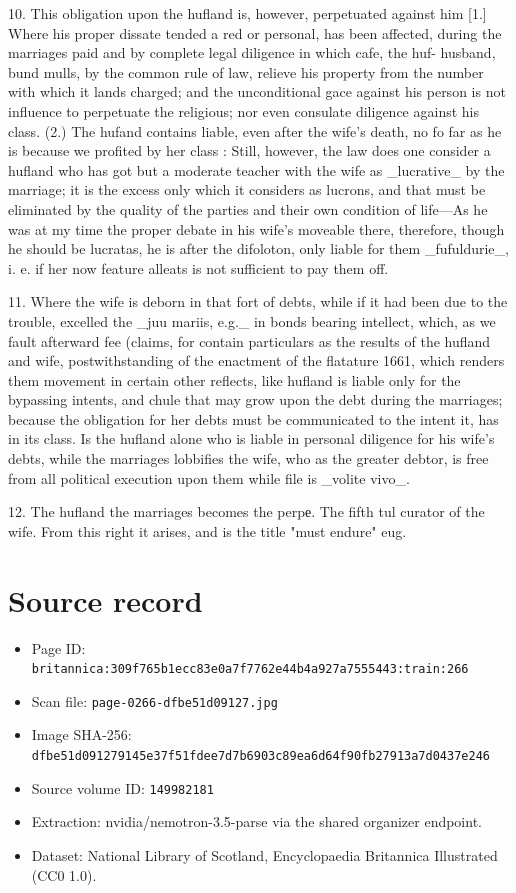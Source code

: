 \documentclass{article}
\begin{document}
10. This obligation upon the hufland is, however, perpetuated against him [1.] Where his proper dissate tended a red or personal, has been affected, during the marriages paid and by complete legal diligence in which cafe, the huf- husband, bund mulls, by the common rule of law, relieve his property from the number with which it lands charged; and the unconditional gace against his person is not influence to perpetuate the religious; nor even consulate diligence against his class. (2.) The hufand contains liable, even after the wife’s death, no fo far as he is because we profited by her class : Still, however, the law does one consider a hufland who has got but a moderate teacher with the wife as \_lucrative\_ by the marriage; it is the excess only which it considers as lucrons, and that must be eliminated by the quality of the parties and their own condition of life—As he was at my time the proper debate in his wife’s moveable there, therefore, though he should be lucratas, he is after the difoloton, only liable for them \_fufuldurie\_, i. e. if her now feature alleats is not sufficient to pay them off.

11. Where the wife is deborn in that fort of debts, while if it had been due to the trouble, excelled the \_juu mariis, e.g.\_ in bonds bearing intellect, which, as we fault afterward fee (claims, for contain particulars as the results of the hufland and wife, postwithstanding of the enactment of the flatature 1661, which renders them movement in certain other reflects, like hufland is liable only for the bypassing intents, and chule that may grow upon the debt during the marriages; because the obligation for her debts must be communicated to the intent it, has in its class. Is the hufland alone who is liable in personal diligence for his wife’s debts, while the marriages lobbifies the wife, who as the greater debtor, is free from all political execution upon them while file is \_volite vivo\_.

12. The hufland the marriages becomes the perpе. The fifth tul curator of the wife. From this right it arises, and is the title "must endure" eug.

\section*{Source record}
\begin{itemize}
\item Page ID: \texttt{britannica:309f765b1ecc83e0a7f7762e44b4a927a7555443:train:266}
\item Scan file: \texttt{page-0266-dfbe51d09127.jpg}
\item Image SHA-256: \texttt{dfbe51d091279145e37f51fdee7d7b6903c89ea6d64f90fb27913a7d0437e246}
\item Source volume ID: \texttt{149982181}
\item Extraction: nvidia/nemotron-3.5-parse via the shared organizer endpoint.
\item Dataset: National Library of Scotland, Encyclopaedia Britannica Illustrated (CC0 1.0).
\end{itemize}
\end{document}
